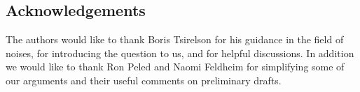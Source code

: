 {
\subsection{Acknowledgements}

The authors would like to thank Boris Tsirelson for his guidance in
the field of noises, for introducing the question to us, and for helpful
discussions.  In addition we would like to thank Ron Peled and Naomi
Feldheim for simplifying some of our arguments and their useful
comments on preliminary drafts.
}
